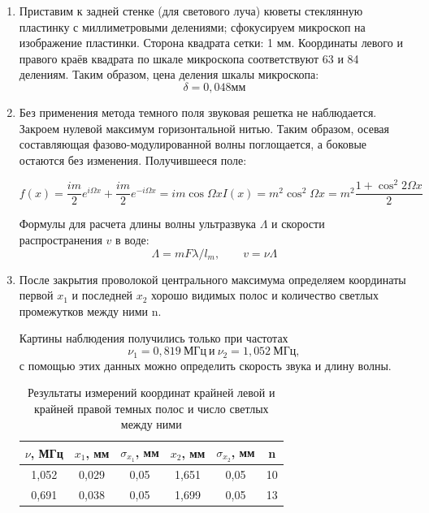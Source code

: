 \documentclass[a4paper,12pt]{article} %
\theoremstyle{plain} %
\theoremstyle{definition} %
\theoremstyle{remark} %
\begin{document}
\begin{enumerate}
	\item Приставим к задней стенке (для светового луча) кюветы стеклянную пластинку с миллиметровыми делениями; сфокусируем микроскоп на изображение пластинки.
	Сторона квадрата сетки: 1 мм. Координаты левого и правого краёв квадрата по шкале микроскопа соответствуют 63 и 84 делениям. Таким образом, цена деления шкалы микроскопа:
	\[ \delta=0,048 мм \]
	
	\item Без применения метода темного поля звуковая решетка не наблюдается. Закроем нулевой максимум горизонтальной нитью. Таким образом, осевая составляющая фазово-модулированной волны поглощается, а боковые остаются без изменения. Получившееся поле: 
	
	\begin{equation}\label{}
		f(x) = \dfrac{im}{2} e^{i\Omega x} +  \dfrac{im}{2} e^{-i\Omega x} = im \cos \Omega x I(x) = m^2 \cos ^2 \Omega x = m^2 \dfrac{1 + \cos ^2 2 \Omega x}{2}
	\end{equation}
	
	Формулы для расчета длины волны ультразвука $ \Lambda $ и скорости распространения $ v $ в воде:
	\begin{equation}\label{}
		\Lambda  = mF\lambda/l_m,  \qquad v = \nu\Lambda
	\end{equation}

	\item После закрытия проволокой центрального максимума определяем координаты первой $x_1$ и последней $x_2$ хорошо видимых полос и количество светлых промежутков между ними n.
	
	Картины наблюдения получились только при частотах 
	\[\nu_1 = 0,819\ МГц \ и \ \nu_2 = 1,052 \ МГц,\] 
	с помощью этих данных можно определить скорость звука и длину волны. 
	
	\begin{table}[!ht]
		\centering
		\begin{tabular}{|c|c|c|c|c|c|}
			\hline
			 $\nu$, МГц & $x_1$, мм & $\sigma_{x_1}$, мм & $x_2$, мм & $\sigma_{x_2}$, мм & n  \\ \hline
			 1,052 & 0,029 & 0,05 & 1,651 & 0,05 & 10  \\ \hline
			0,691 & 0,038 & 0,05 & 1,699 & 0,05 & 13  \\ \hline
		\end{tabular}
		\caption{Результаты измерений координат крайней левой и крайней правой темных полос и число светлых между ними}
	\end{table}
	

\end{enumerate}
\end{document}
